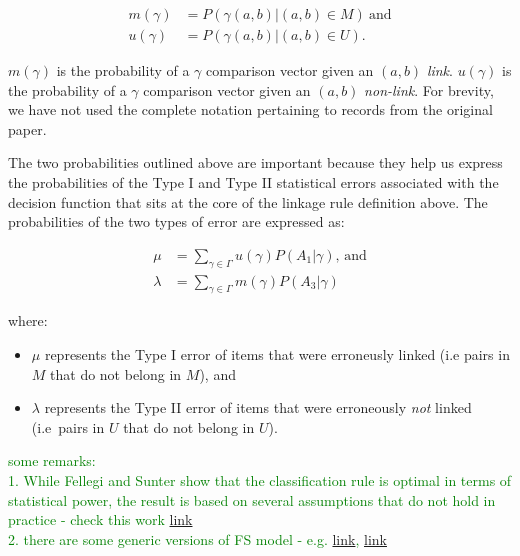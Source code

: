 \documentclass[journal]{IEEEtran}
\begin{document}
    \begin{align}
        m(\gamma)&=P(\gamma(a, b) | (a, b) \in M)~\textrm{and}\nonumber\\
        u(\gamma)&=P(\gamma(a, b) | (a, b) \in U)\textrm{.}\nonumber
    \end{align}

    \noindent
    $m(\gamma)$ is the probability of a $\gamma$ comparison vector given an
    $(a, b)$ \textit{link}.
    $u(\gamma)$ is the probability of a $\gamma$ comparison vector given an
    $(a, b)$ \textit{non-link}.
    For brevity, we have not used the complete notation pertaining to records
    from the original paper.

    The two probabilities outlined above are important because they help us
    express the probabilities of the Type I and Type II statistical errors
    associated with the decision function that sits at the core of the linkage
    rule definition above.
    The probabilities of the two types of error are expressed as:

    \begin{align}
        \mu&=\sum_{\gamma \in \varGamma}u(\gamma)P(A_1|\gamma)\textrm{,~and}\nonumber\\
        \lambda&=\sum_{\gamma \in \varGamma}m(\gamma)P(A_3|\gamma)\nonumber
    \end{align}

    where:

    \begin{itemize}
        \item $\mu$ represents the Type I error of items that were erroneusly
        linked (i.e pairs in $M$ that do not belong in $M$), and
        \item $\lambda$ represents the Type II error of items that were
        erroneously \textit{not} linked (i.e~pairs in $U$ that do not belong in
        $U$).
    \end{itemize}


    \textcolor{green}{some remarks:\\ 
    1. While Fellegi and Sunter show that the classification rule is optimal in terms of statistical power, the result is based on several assumptions that do not hold in practice - check this work \href{https://www.jstor.org/stable/23024863?seq=1}{link}\\
    2. there are some generic versions of FS model - e.g. \href{https://www.jstor.org/stable/pdf/24246450.pdf}{link}, \href{https://projecteuclid.org/journals/annals-of-applied-statistics/volume-8/issue-4/Detecting-duplicates-in-a-homicide-registry-using-a-Bayesian-partitioning/10.1214/14-AOAS779.full}{link}\\
    }
\end{document}

